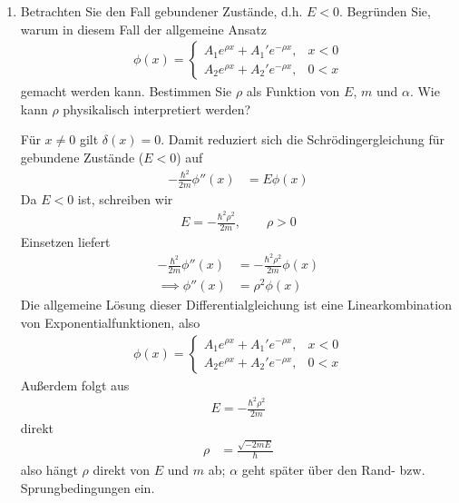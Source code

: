 \documentclass[11pt,a4paper]{scrartcl}
\begin{document}
\begin{enumerate}[label=(\alph*)]
    \item Betrachten Sie den Fall gebundener Zustände, d.h. $E < 0$. Begründen Sie, warum in diesem Fall der allgemeine Ansatz
    \begin{align*}
        \phi(x) = \begin{cases}
            A_1e^{\rho x} + A_1'e^{-\rho x},&x < 0\\
            A_2e^{\rho x} + A_2'e^{-\rho x},& 0 < x
        \end{cases}
    \end{align*}
    gemacht werden kann. Bestimmen Sie $\rho$ als Funktion von $E$, $m$ und $\alpha$. Wie kann $\rho$ physikalisch interpretiert werden?
    \begin{tcolorbox}[title=Berechnung, breakable]
        Für $x\neq 0$ gilt $\delta(x)=0$. Damit reduziert sich die Schrödingergleichung für gebundene Zustände ($E<0$) auf
        \begin{align*}
            -\frac{\hbar^2}{2m}\phi''(x) &= E \phi(x)
        \end{align*}
        Da $E<0$ ist, schreiben wir
        \begin{align*}
            E = -\frac{\hbar^2\rho^2}{2m},
            \qquad \rho>0
        \end{align*}
        Einsetzen liefert
        \begin{align*}
            -\frac{\hbar^2}{2m}\phi''(x) &= -\frac{\hbar^2\rho^2}{2m} \phi(x)\\
            \implies \phi''(x) &= \rho^2\phi(x)
        \end{align*}
        Die allgemeine Lösung dieser Differentialgleichung ist eine Linearkombination von Exponentialfunktionen, also
        \begin{align*}
            \phi(x) = \begin{cases}
                A_1e^{\rho x} + A_1'e^{-\rho x},&x < 0\\
                A_2e^{\rho x} + A_2'e^{-\rho x},& 0 < x
            \end{cases}
        \end{align*}
        Außerdem folgt aus
        \begin{align*}
            E = -\frac{\hbar^2\rho^2}{2m}
        \end{align*}
        direkt
        \begin{align*}
            \rho &= \frac{\sqrt{-2mE}}{\hbar}
        \end{align*}
        also hängt $\rho$ direkt von $E$ und $m$ ab; $\alpha$ geht später über den Rand- bzw. Sprungbedingungen ein.


\end{tcolorbox}
\end{enumerate}
\end{document}
